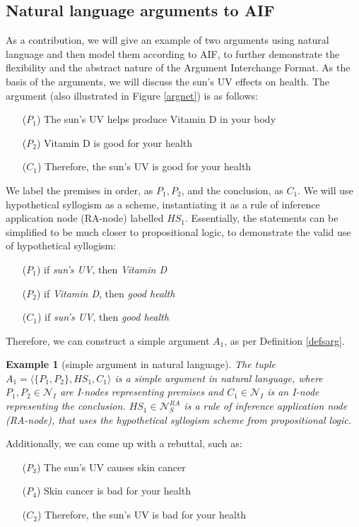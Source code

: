 \documentclass[12pt, a4paper]{article}
\newtheorem{Ex}{Example}[subsection]
\begin{document}
\subsection{Natural language arguments to AIF}
As a contribution, we will give an example of two arguments using natural language and then model them according to AIF, to further demonstrate the flexibility and the abstract nature of the Argument Interchange Format. As the basis of the arguments, we will discuss the sun's UV effects on health. The argument (also illustrated in Figure \ref{argnet}) is as follows:
\begin{itemize}
    \item[($P_1$)] The sun's UV helps produce Vitamin D in your body
    \item[($P_2$)] Vitamin D is good for your health
    \item[($C_1$)] Therefore, the sun's UV is good for your health
\end{itemize}
We label the premises in order, as $P_1, P_2$, and the conclusion, as $C_1$. We will use hypothetical syllogism as a scheme, instantiating it as a rule of inference application node (RA-node) labelled $HS_1$. Essentially, the statements can be simplified to be much closer to propositional logic, to demonstrate the valid use of hypothetical syllogism:
\begin{itemize}
    \item[($P_1$)] if \emph{sun's UV}, then \emph{Vitamin D}
    \item[($P_2$)] if \emph{Vitamin D}, then \emph{good health}
    \item[($C_1$)] if \emph{sun's UV}, then \emph{good health}
\end{itemize}
Therefore, we can construct a simple argument $A_1$, as per Definition \ref{defsarg}. 
\begin{Ex}[simple argument in natural language]
\sloppy The tuple $A_1 = \langle \lbrace P_1, P_2 \rbrace, HS_1, C_1\rangle$ is a simple argument in natural language, where $P_1, P_2 \in \mathcal{N}_I$ are I-nodes representing premises and $C_1 \in \mathcal{N}_I$ is an I-node representing the conclusion. $HS_1 \in \mathcal{N}_S^{RA}$ is a rule of inference application node (RA-node), that uses the hypothetical syllogism scheme from propositional logic.
\end{Ex}
Additionally, we can come up with a rebuttal, such as:
\begin{itemize}
    \item[($P_3$)] The sun's UV causes skin cancer
    \item[($P_4$)] Skin cancer is bad for your health
    \item[($C_2$)] Therefore, the sun's UV is bad for your health
\end{itemize}
\end{document}
